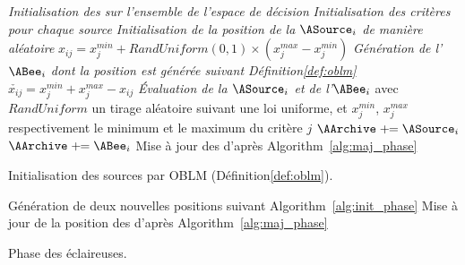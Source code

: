 \begin{algorithm}\label{alg:init_phase}
  \SetAlgoVlined
  \DontPrintSemicolon
  \emph{Initialisation des \ASources sur l’ensemble de l’espace de décision}\;
  {
    \emph{Initialisation des critères pour chaque source}\;
    {
       \emph{Initialisation de la position de la $\ASource_{i}$ de manière aléatoire}\;
      \Indp
      $x_{ij} = x_{j}^{min} + RandUniform(0, 1) \times (x_{j}^{max} - x_{j}^{min})$\;
      \Indm
      \BlankLine
        \emph{Génération de l’$\ABee_{i}$ dont la position est générée suivant Définition\ref{def:oblm}}\;
      \Indp
      $ \check{x_{ij}} = x_{j}^{min} + x_{j}^{max} - x_{ij}$\;
      \Indm
      \BlankLine
       \emph{Évaluation de la $\ASource_{i}$ et de l’$\ABee_{i}$}\;
      \BlankLine
      avec $RandUniform$ un tirage aléatoire suivant une loi uniforme, et $x_{j}^{min}$, $x_{j}^{max}$
      respectivement le minimum et le maximum du critère $j$\;
    }
    {
      $\AArchive \pluseq \ASource_{i}$ 
    }
    {
      $\AArchive \pluseq \ABee_{i}$ 
    }
  }
  Mise à jour des \ASources d’après Algorithm~\ref{alg:maj_phase}\;
  \caption{Initialisation des sources par OBLM (Définition\ref{def:oblm}).}
\end{algorithm}

\begin{algorithm}\label{alg:scout_phase}
  \SetAlgoVlined
  \DontPrintSemicolon
  {
    {
      Génération de deux nouvelles positions suivant Algorithm~\ref{alg:init_phase}\;
    }
  }
  Mise à jour de la position des \ASources d’après Algorithm~\ref{alg:maj_phase}\;
  \caption{Phase des éclaireuses.}
\end{algorithm}


